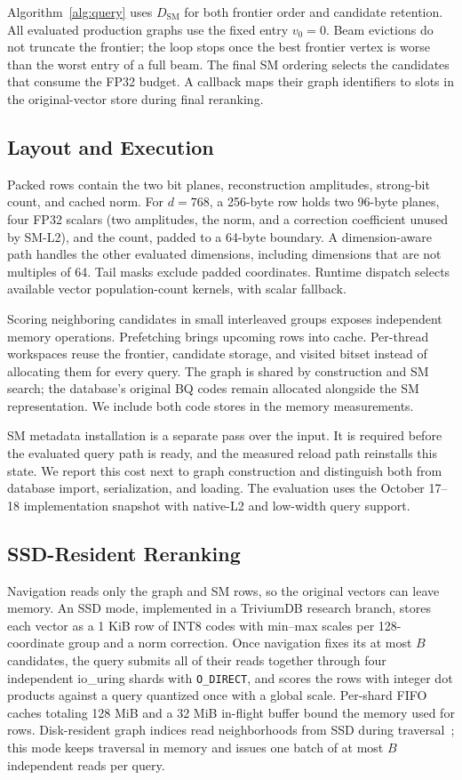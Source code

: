 Algorithm~\ref{alg:query} uses $D_{\mathrm{SM}}$ for both frontier order and candidate retention. All evaluated production graphs use the fixed entry $v_0=0$. Beam evictions do not truncate the frontier; the loop stops once the best frontier vertex is worse than the worst entry of a full beam. The final SM ordering selects the candidates that consume the FP32 budget. A callback maps their graph identifiers to slots in the original-vector store during final reranking.

\subsection{Layout and Execution}
Packed rows contain the two bit planes, reconstruction amplitudes, strong-bit count, and cached norm. For $d=768$, a 256-byte row holds two 96-byte planes, four FP32 scalars (two amplitudes, the norm, and a correction coefficient unused by SM-L2), and the count, padded to a 64-byte boundary. A dimension-aware path handles the other evaluated dimensions, including dimensions that are not multiples of 64. Tail masks exclude padded coordinates. Runtime dispatch selects available vector population-count kernels, with scalar fallback.

Scoring neighboring candidates in small interleaved groups exposes independent memory operations. Prefetching brings upcoming rows into cache. Per-thread workspaces reuse the frontier, candidate storage, and visited bitset instead of allocating them for every query. The graph is shared by construction and SM search; the database's original BQ codes remain allocated alongside the SM representation. We include both code stores in the memory measurements.

SM metadata installation is a separate pass over the input. It is required before the evaluated query path is ready, and the measured reload path reinstalls this state. We report this cost next to graph construction and distinguish both from database import, serialization, and loading. The evaluation uses the October 17--18 implementation snapshot with native-L2 and low-width query support.

\subsection{SSD-Resident Reranking}
\label{sec:ssd}
Navigation reads only the graph and SM rows, so the original vectors can leave memory. An SSD mode, implemented in a TriviumDB research branch, stores each vector as a 1 KiB row of INT8 codes with min--max scales per 128-coordinate group and a norm correction. Once navigation fixes its at most $B$ candidates, the query submits all of their reads together through four independent io\_uring shards with \texttt{O\_DIRECT}, and scores the rows with integer dot products against a query quantized once with a global scale. Per-shard FIFO caches totaling 128 MiB and a 32 MiB in-flight buffer bound the memory used for rows. Disk-resident graph indices read neighborhoods from SSD during traversal~\cite{jayaram2019diskann,wang2024starling,guo2025pipeann}; this mode keeps traversal in memory and issues one batch of at most $B$ independent reads per query.
